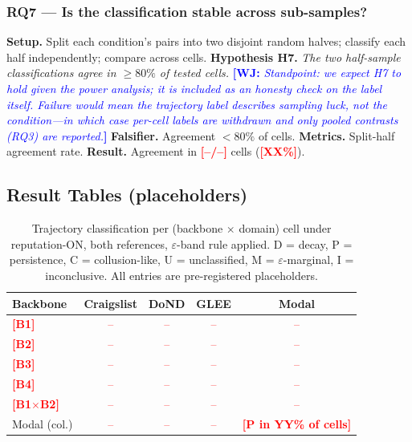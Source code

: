 \documentclass[conference]{IEEEtran}
\newcommand{\wj}[1]{\textcolor{blue}{\textbf{[WJ:} \textit{#1}\textbf{]}}}
\newcommand{\ph}[1]{\textcolor{red}{\textbf{[#1]}}}
\newcommand{\rescell}{\textcolor{red}{--}}
\newcommand{\eps}{\varepsilon}
\begin{document}
\subsubsection*{RQ7 --- Is the classification stable across sub-samples?}
\textbf{Setup.} Split each condition's pairs into two disjoint random halves;
classify each half independently; compare across cells.
\textbf{Hypothesis H7.} \emph{The two half-sample classifications agree in
$\geq 80\%$ of tested cells.}
\wj{Standpoint: we expect H7 to hold given the power analysis; it is included
as an honesty check on the label itself. Failure would mean the trajectory
label describes sampling luck, not the condition---in which case per-cell
labels are withdrawn and only pooled contrasts (RQ3) are reported.}
\textbf{Falsifier.} Agreement $< 80\%$ of cells.
\textbf{Metrics.} Split-half agreement rate.
\textbf{Result.} Agreement in \ph{--/--} cells (\ph{XX\%}).

\subsection{Result Tables (placeholders)}

\begin{table}[t]
\caption{Trajectory classification per (backbone $\times$ domain) cell under
reputation-ON, both references, $\eps$-band rule applied. D = decay, P =
persistence, C = collusion-like, U = unclassified, M = $\eps$-marginal, I =
inconclusive. All entries are pre-registered placeholders.}
\label{tab:classes}
\centering
\begin{tabular}{lcccc}
\toprule
Backbone & Craigslist & DoND & GLEE & Modal \\
\midrule
\ph{B1} & \rescell & \rescell & \rescell & \rescell \\
\ph{B2} & \rescell & \rescell & \rescell & \rescell \\
\ph{B3} & \rescell & \rescell & \rescell & \rescell \\
\ph{B4} & \rescell & \rescell & \rescell & \rescell \\
\ph{B1$\times$B2} & \rescell & \rescell & \rescell & \rescell \\
\midrule
Modal (col.) & \rescell & \rescell & \rescell &
\ph{P in YY\% of cells} \\
\bottomrule
\end{tabular}
\end{table}
\end{document}
